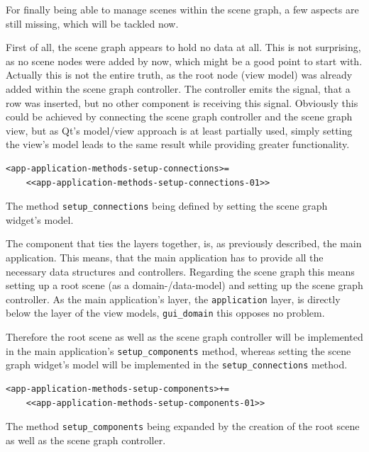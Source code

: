 \documentclass[10pt, openright, notitlepage]{scrreprt}
\begin{document}
For finally being able to manage scenes within the scene graph, a few aspects
are still missing, which will be tackled now.

First of all, the scene graph appears to hold no data at all. This is not
surprising, as no scene nodes were added by now, which might be a good point to
start with. Actually this is not the entire truth, as the root node (view model)
was already added within the scene graph controller. The controller emits the
signal, that a row was inserted, but no other component is receiving this
signal. Obviously this could be achieved by connecting the scene graph
controller and the scene graph view, but as Qt's model/view approach is at least
partially used, simply setting the view's model leads to the same result while
providing greater functionality.

\begin{listing}[H]
\begin{verbatim}
<app-application-methods-setup-connections>=
    <<app-application-methods-setup-connections-01>>
\end{verbatim}
\caption{\label{lst:app-application-methods-setup-connections-01}
The method \texttt{setup\_connections} being defined by setting the scene graph widget's model.}
\end{listing}

The component that ties the layers together, is, as previously described, the
main application. This means, that the main application has to provide all the
necessary data structures and controllers. Regarding the scene graph this means
setting up a root scene (as a domain-/data-model) and setting up the scene graph
controller. As the main application's layer, the \texttt{application} layer,
is directly below the layer of the view models, \texttt{gui\_domain} this
opposes no problem.

Therefore the root scene as well as the scene graph controller will be
implemented in the main application's \texttt{setup\_components} method,
whereas setting the scene graph widget's model will be implemented in the
\texttt{setup\_connections} method.

\begin{listing}[H]
\begin{verbatim}
<app-application-methods-setup-components>+=
    <<app-application-methods-setup-components-01>>
\end{verbatim}
\caption{The method \texttt{setup\_components} being expanded by the creation of the root scene as well as the scene graph controller.}
\end{listing}
\end{document}

